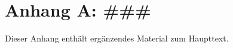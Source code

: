 \appendix
\section{Anhang A: \#\#\#}\label{sec:additional-materials}

Dieser Anhang enthält ergänzendes Material zum Haupttext.